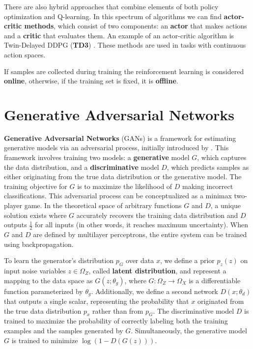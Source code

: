 There are also hybrid approaches that combine elements
of both policy optimization and Q-learning.
In this spectrum of algorithms we can find 
\textbf{actor-critic methods}, which consist of two components:
an \textbf{actor} that makes actions and a \textbf{critic} that evaluates them.
An example of an actor-critic algorithm is Twin-Delayed DDPG (\textbf{TD3})
\cite{td3}.
These methods are used in tasks with continuous action spaces.

If samples are collected during training the reinforcement learning is
considered \textbf{online}, otherwise,
if the training set is fixed, it is \textbf{offline}.

\section{Generative Adversarial Networks}
\label{sec:gan}

\textbf{Generative Adversarial Networks} (GANs) is a framework
for estimating generative models via an adversarial process,
initially introduced by \cite{goodfellow2014}.
This framework involves training two models:
a \textbf{generative} model \( G \), which captures the data
distribution, and a \textbf{discriminative} model \( D \),
which predicts samples as either originating from the true
data distribution or the generative model.
The training objective for \( G \) is to maximize
the likelihood of \( D \) making incorrect classifications.
This adversarial process can be conceptualized as a minimax two-player game.
In the theoretical space of arbitrary functions \( G \) and \( D \),
a unique solution exists where \( G \) accurately
recovers the training data distribution and \( D \) outputs $\frac{1}{2}$
for all inputs (in other words, it reaches maximum uncertainty).
When \( G \) and \( D \) are defined by multilayer perceptrons,
the entire system can be trained using backpropagation.

To learn the generator's distribution \( p_G \)
over data \( x \), we define a prior \( p_z(z) \) on input noise variables
$z \in \Omega_Z$, called \textbf{latent distribution},
and represent a mapping to the data space as
\( G(z; \theta_g) \), where \( G: \Omega_Z \rightarrow \Omega_X \)
is a differentiable function parameterized by \( \theta_g \).
Additionally, we define a second network
\( D(x; \theta_d) \) that outputs a single scalar,
representing the probability that \( x \) originated
from the true data distribution $p_x$ rather than from \( p_G \).
The discriminative model \( D \) is trained to maximize
the probability of correctly labeling both the training
examples and the samples generated by \( G \).
Simultaneously, the generative model \( G \) is trained to minimize
\( \log(1 - D(G(z))) \).

